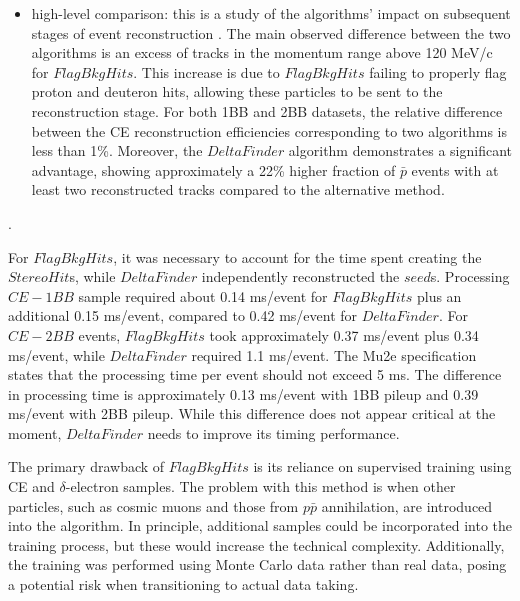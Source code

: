 \begin{itemize}
    \item high-level comparison: this is a study of the algorithms' 
    impact on subsequent stages of event reconstruction 
    . 
    The main observed difference between the two algorithms 
    is an excess of tracks in the momentum range above 120 MeV/c for  
    $FlagBkgHits$. 
    This increase is due to $FlagBkgHits$ failing to 
    properly flag proton and deuteron hits, allowing these particles to be sent to the 
    reconstruction stage. 
    For both 1BB and 2BB datasets, the relative difference between the 
    CE reconstruction efficiencies corresponding to two algorithms is less than 1\%.
    Moreover, the $DeltaFinder$ algorithm demonstrates a significant advantage, 
    showing approximately a 22\% higher fraction of $\bar{p}$ events with at least two reconstructed tracks compared to the alternative method.
\end{itemize}
.

For $FlagBkgHits$, it was necessary to account for the time 
spent creating the $StereoHit$s, while $DeltaFinder$ independently 
reconstructed the $seed$s. Processing $CE-1BB$ sample required about 
0.14 ms/event for $FlagBkgHits$ plus an additional 0.15 ms/event, 
compared to 0.42 ms/event for $DeltaFinder$. For $CE-2BB$ events, 
$FlagBkgHits$ took approximately 0.37 ms/event plus 0.34 ms/event, 
while $DeltaFinder$ required 1.1 ms/event. The Mu2e specification states 
that the processing time per event should not exceed 5 ms. The 
difference in processing time is approximately 0.13 ms/event with 
1BB pileup and 0.39 ms/event with 2BB pileup. While this difference 
does not appear critical at the moment, $DeltaFinder$ needs to improve its timing performance.

The primary drawback of $FlagBkgHits$ is its reliance 
on  supervised  training using CE and $\delta$-electron samples. 
The problem with this method is when other particles, such as cosmic muons 
and those from $p\bar{p}$ annihilation, are introduced into the algorithm. 
In principle, additional samples could be incorporated into the training 
process, but these would increase the technical complexity. 
Additionally, the training was performed using Monte Carlo data 
rather than real data, posing a potential risk when transitioning 
to actual data taking. 

